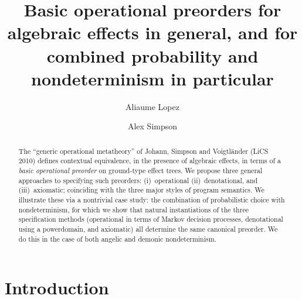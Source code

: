 \documentclass[a4paper,UKenglish]{lipics-v2018}
\title{Basic operational preorders  for algebraic effects in general, and for
combined probability and nondeterminism in particular}
\author{Aliaume Lopez}{\'Ecole Normale Sup\'erieure Paris-Saclay\\{Universit\'e Paris-Saclay, France}}{aliaume.lopez@ens-paris-saclay.fr}{}{}%
\author{Alex Simpson}{Faculty of Mathematics and Physics\\{University of Ljubljana, Slovenia}}{Alex.Simpson@fmf.uni-lj.si}{}{}
\theoremstyle{plain}
\begin{document}
\maketitle

\begin{abstract}
The ``generic operational metatheory'' of  Johann, Simpson and Voigtl\"{a}nder (LiCS 2010) defines
contextual equivalence, 
in the presence of algebraic effects, in terms of a
\emph{basic operational preorder} on ground-type effect trees. We propose three general approaches to 
specifying such preorders: (i)~operational (ii)~denotational, and (iii)~axiomatic; coinciding with the three major styles of program semantics. We illustrate these via a nontrivial case study: the combination of probabilistic choice with nondeterminism, for which we show that  natural instantiations of the three specification methods (operational in terms of Markov decision processes, denotational using  a powerdomain, and axiomatic) all determine the same canonical preorder. We do this in the case of both angelic and demonic nondeterminism. 
 \end{abstract}

\section{Introduction}
\label{section:intro}


\end{document}

